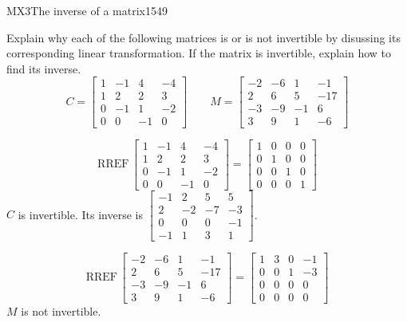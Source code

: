 \begin{exercise}{MX3}{The inverse of a matrix}{1549} 
\begin{exerciseStatement} 

 Explain why each of the following matrices is or is not invertible by disussing its corresponding linear transformation. If the matrix is invertible, explain how to find its inverse. \[
\hspace{2em}
C = \left[\begin{array}{cccc}
1 & -1 & 4 & -4 \\
1 & 2 & 2 & 3 \\
0 & -1 & 1 & -2 \\
0 & 0 & -1 & 0
\end{array}\right]
\hspace{2em}
M = \left[\begin{array}{cccc}
-2 & -6 & 1 & -1 \\
2 & 6 & 5 & -17 \\
-3 & -9 & -1 & 6 \\
3 & 9 & 1 & -6
\end{array}\right]
\hspace{2em}
        \] 

 \end{exerciseStatement}
 \begin{exerciseAnswer} 

 \[\mathrm{RREF}\,\left[\begin{array}{cccc}
1 & -1 & 4 & -4 \\
1 & 2 & 2 & 3 \\
0 & -1 & 1 & -2 \\
0 & 0 & -1 & 0
\end{array}\right]=\left[\begin{array}{cccc}
1 & 0 & 0 & 0 \\
0 & 1 & 0 & 0 \\
0 & 0 & 1 & 0 \\
0 & 0 & 0 & 1
\end{array}\right]\] \(C\) is invertible. Its inverse is \(\left[\begin{array}{cccc}
-1 & 2 & 5 & 5 \\
2 & -2 & -7 & -3 \\
0 & 0 & 0 & -1 \\
-1 & 1 & 3 & 1
\end{array}\right]\). 

 

 \[\mathrm{RREF}\,\left[\begin{array}{cccc}
-2 & -6 & 1 & -1 \\
2 & 6 & 5 & -17 \\
-3 & -9 & -1 & 6 \\
3 & 9 & 1 & -6
\end{array}\right]=\left[\begin{array}{cccc}
1 & 3 & 0 & -1 \\
0 & 0 & 1 & -3 \\
0 & 0 & 0 & 0 \\
0 & 0 & 0 & 0
\end{array}\right]\] \(M\) is not invertible. 

 \end{exerciseAnswer}
 \end{exercise}


